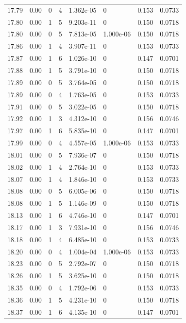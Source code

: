 \documentclass[preview]{standalone}
\begin{document}
{{{{{{{{{{{{{{{{{{\begin{tabular}{L{1.2cm}C{1.2cm} C{0.3cm}C{0.5cm} C{1.4cm}C{1.4cm} C{1.4cm}C{1.4cm}}
  17.79  &  0.00  & 0     &  4 &  1.362e-05  & 0  & 0.153 &  0.0733   \\ 
  17.80  &  0.00  & 1     &  5 &  9.203e-11  & 0  & 0.150 &  0.0718   \\ 
  17.80  &  0.00  & 0     &  5 &  7.813e-05  & 1.000e-06  & 0.150 &  0.0718   \\ 
  17.86  &  0.00  & 1     &  4 &  3.907e-11  & 0  & 0.153 &  0.0733   \\ 
  17.87  &  0.00  & 1     &  6 &  1.026e-10  & 0  & 0.147 &  0.0701   \\ 
  17.88  &  0.00  & 1     &  5 &  3.791e-10  & 0  & 0.150 &  0.0718   \\ 
  17.89  &  0.00  & 0     &  5 &  3.764e-05  & 0  & 0.150 &  0.0718   \\ 
  17.89  &  0.00  & 0     &  4 &  1.763e-05  & 0  & 0.153 &  0.0733   \\ 
  17.91  &  0.00  & 0     &  5 &  3.022e-05  & 0  & 0.150 &  0.0718   \\ 
  17.92  &  0.00  & 1     &  3 &  4.312e-10  & 0  & 0.156 &  0.0746   \\ 
  17.97  &  0.00  & 1     &  6 &  5.835e-10  & 0  & 0.147 &  0.0701   \\ 
  17.99  &  0.00  & 0     &  4 &  4.557e-05  & 1.000e-06  & 0.153 &  0.0733   \\ 
  18.01  &  0.00  & 0     &  5 &  7.936e-07  & 0  & 0.150 &  0.0718   \\ 
  18.02  &  0.00  & 1     &  4 &  2.764e-10  & 0  & 0.153 &  0.0733   \\ 
  18.07  &  0.00  & 1     &  4 &  1.846e-10  & 0  & 0.153 &  0.0733   \\ 
  18.08  &  0.00  & 0     &  5 &  6.005e-06  & 0  & 0.150 &  0.0718   \\ 
  18.08  &  0.00  & 1     &  5 &  1.146e-09  & 0  & 0.150 &  0.0718   \\ 
  18.13  &  0.00  & 1     &  6 &  4.746e-10  & 0  & 0.147 &  0.0701   \\ 
  18.17  &  0.00  & 1     &  3 &  7.931e-10  & 0  & 0.156 &  0.0746   \\ 
  18.18  &  0.00  & 1     &  4 &  6.485e-10  & 0  & 0.153 &  0.0733   \\ 
  18.20  &  0.00  & 0     &  4 &  1.004e-04  & 1.000e-06  & 0.153 &  0.0733   \\ 
  18.23  &  0.00  & 0     &  5 &  2.792e-07  & 0  & 0.150 &  0.0718   \\ 
  18.26  &  0.00  & 1     &  5 &  3.625e-10  & 0  & 0.150 &  0.0718   \\ 
  18.35  &  0.00  & 0     &  4 &  1.792e-06  & 0  & 0.153 &  0.0733   \\ 
  18.36  &  0.00  & 1     &  5 &  4.231e-10  & 0  & 0.150 &  0.0718   \\ 
  18.37  &  0.00  & 1     &  6 &  4.135e-10  & 0  & 0.147 &  0.0701   \\ 
\hline 
\end{tabular} 

}}}}}}}}}}}}}}}}}}
\end{document}

